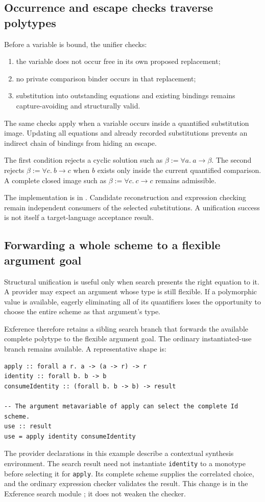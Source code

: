 \documentclass[11pt]{article}
\newcommand{\code}[1]{\texttt{#1}}
\begin{document}
\subsection{Occurrence and escape checks traverse polytypes}

Before a variable is bound, the unifier checks:
\begin{enumerate}
  \item the variable does not occur free in its own proposed replacement;
  \item no private comparison binder occurs in that replacement;
  \item substitution into outstanding equations and existing bindings remains
    capture-avoiding and structurally valid.
\end{enumerate}
The same checks apply when a variable occurs inside a quantified substitution
image. Updating all equations and already recorded substitutions prevents an
indirect chain of bindings from hiding an escape.

The first condition rejects a cyclic solution such as
$\beta := \forall a.\ a\to\beta$. The second rejects
$\beta:=\forall c.\ b\to c$ when $b$ exists only inside the current
quantified comparison. A complete closed image such as
$\beta := \forall c.\ c\to c$ remains admissible.

The implementation is in
.
Candidate reconstruction and expression checking remain independent consumers
of the selected substitutions. A unification success is not itself a
target-language acceptance result.

\subsection{Forwarding a whole scheme to a flexible argument goal}

Structural unification is useful only when search presents the right equation
to it. A provider may expect an argument whose type is still flexible. If a
polymorphic value is available, eagerly eliminating all of its quantifiers
loses the opportunity to choose the entire scheme as that argument's type.

Exference therefore retains a sibling search branch that forwards the
available complete polytype to the flexible argument goal. The ordinary
instantiated-use branch remains available. A representative shape is:
\begin{lstlisting}
apply :: forall a r. a -> (a -> r) -> r
identity :: forall b. b -> b
consumeIdentity :: (forall b. b -> b) -> result

-- The argument metavariable of apply can select the complete Id scheme.
use :: result
use = apply identity consumeIdentity
\end{lstlisting}
The provider declarations in this example describe a contextual synthesis
environment. The search result need not instantiate \code{identity} to a
monotype before selecting it for \code{apply}. Its complete scheme supplies
the correlated choice, and the ordinary expression checker validates the
result. This change is in the Exference search module
; it does not weaken the checker.
\end{document}
